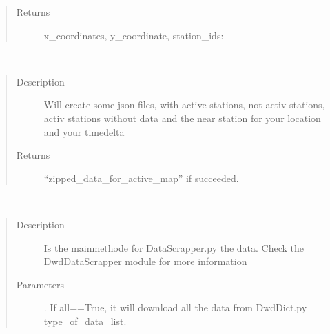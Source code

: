 \documentclass[letterpaper,10pt,english]{sphinxmanual}
\begin{document}
\begin{fulllineitems}
\begin{fulllineitems}
\begin{quote}
\begin{description}
\item[{Returns}] \leavevmode
\sphinxAtStartPar
x\_coordinates, y\_coordinate, station\_ids: 

\end{description}\end{quote}

\end{fulllineitems}


\begin{fulllineitems}
\label{\detokenize{DwdMain:DwdMain.DwdMain.main_data_map}}~\begin{quote}\begin{description}
\item[{Description}] \leavevmode
\sphinxAtStartPar
Will create some json files, with active stations, not activ stations, activ stations without data and the near station for your location and your timedelta

\item[{Returns}] \leavevmode
\sphinxAtStartPar
“zipped\_data\_for\_active\_map” if succeeded.

\end{description}\end{quote}

\end{fulllineitems}


\begin{fulllineitems}
\label{\detokenize{DwdMain:DwdMain.DwdMain.main_datascrapper}}~\begin{quote}\begin{description}
\item[{Description}] \leavevmode
\sphinxAtStartPar
Is the main\sphinxhyphen{}methode for DataScrapper.py the data. Check the DwdDataScrapper module for more information

\item[{Parameters}] \leavevmode
\sphinxAtStartPar
{} \textendash{} . If all==True, it will download all the data from DwdDict.py type\_of\_data\_list.


\end{description}
\end{quote}
\end{fulllineitems}
\end{fulllineitems}
\end{document}
